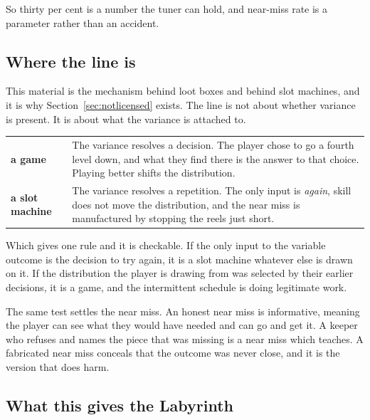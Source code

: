 \documentclass[11pt,a4paper]{article}
\begin{document}
So thirty per cent is a number the tuner can hold, and near-miss rate is a parameter rather than
an accident.

\subsection{Where the line is}

This material is the mechanism behind loot boxes and behind slot machines, and it is why
Section~\ref{sec:notlicensed} exists. The line is not about whether variance is present. It is
about what the variance is attached to.

\begin{center}
\begin{tabular}{@{}l@{\hspace{5mm}}>{\raggedright\arraybackslash}p{}@{}}
\toprule
\textbf{a game}         & The variance resolves a decision. The player chose to go a fourth level
down, and what they find there is the answer to that choice. Playing better shifts the
distribution. \\[1mm]
\textbf{a slot machine} & The variance resolves a repetition. The only input is \emph{again},
skill does not move the distribution, and the near miss is manufactured by stopping the reels
just short. \\
\bottomrule
\end{tabular}
\end{center}

\begin{sectionbox}
Which gives one rule and it is checkable. If the only input to the variable outcome is the
decision to try again, it is a slot machine whatever else is drawn on it. If the distribution the
player is drawing from was selected by their earlier decisions, it is a game, and the intermittent
schedule is doing legitimate work.
\end{sectionbox}

The same test settles the near miss. An honest near miss is informative, meaning the player can
see what they would have needed and can go and get it. A keeper who refuses and names the piece
that was missing is a near miss which teaches. A fabricated near miss conceals that the outcome
was never close, and it is the version that does harm.

\subsection{What this gives the Labyrinth}
\end{document}

